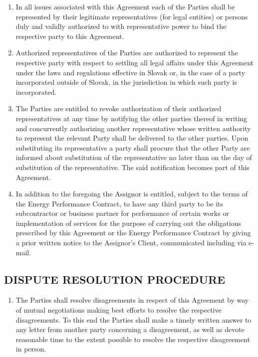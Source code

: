 \documentclass[a4paper]{article}
\begin{document}
\begin{multicols}{2}
  \begin{enumerate}
  \item{In all issues associated with this Agreement each of the
      Parties shall be represented by their legitimate representatives
      (for legal entities) or persons duly and validly authorized to
      with representative power to bind the respective party to this
      Agreement.}

  \item{Authorized representatives of the Parties are authorized to
      represent the respective party with respect to settling all
      legal affairs under this Agreement under the laws and
      regulations effective in Slovak or, in the case of a party
      incorporated outside of Slovak, in the jurisdiction in which
      such party is incorporated.  }

  \item{The Parties are entitled to revoke authorization of their
      authorized representatives at any time by notifying the other
      parties thereof in writing and concurrently authorizing another
      representative whose written authority to represent the relevant
      Party shall be delivered to the other parties. Upon substituting
      its representative a party shall procure that the other Party
      are informed about substitution of the representative no later
      than on the day of substitution of the representative. The said
      notification becomes part of this Agreement.}

  \item{In addition to the foregoing the Assignor is entitled, subject
      to the terms of the Energy Performance Contract, to have any
      third party to be its subcontractor or business partner for
      performance of certain works or implementation of services for
      the purpose of carrying out the obligations prescribed by this
      Agreement or the Energy Performance Contract by giving a prior
      written notice to the Assignor's Client, communicated including
      via e{-}mail.}
  \end{enumerate}

  \subsection{DISPUTE RESOLUTION PROCEDURE}

  \begin{enumerate}
  \item{The Parties shall resolve disagreements in respect of this
      Agreement by way of mutual negotiations making best efforts to
      resolve the respective disagreements. To this end the Parties
      shall make a timely written answer to any letter from another
      party concerning a disagreement, as well as devote reasonable
      time to the extent possible to resolve the respective
      disagreement in person.}


\end{enumerate}
\end{multicols}
\end{document}
